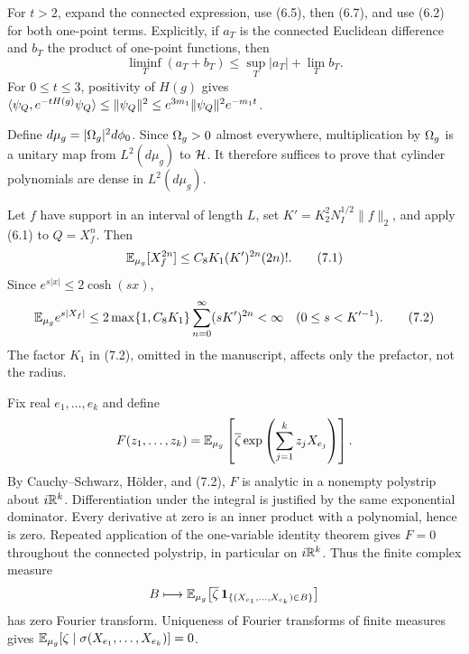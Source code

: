 \documentclass[11pt,a4paper]{article}
\begin{document}
\Because For $t>2$, expand the connected expression, use (6.5), then (6.7),
and use (6.2) for both one-point terms.  Explicitly, if $a_T$ is the connected
Euclidean difference and $b_T$ the product of one-point functions, then
\[
 \liminf_T(a_T+b_T)\leq\sup_T|a_T|+\lim_Tb_T.
\]
For $0\leq t\leq3$, positivity of $H(g)$ gives
$\langle \psi_Q,e^{-tH(g)}\psi_Q\rangle\leq\|\psi_Q\|^2
\leq e^{3m_1}\|\psi_Q\|^2e^{-m_1t}$.

\QedStep


Define $d\mu_g=|\Omega_g|^2d\phi_0$.  Since $\Omega_g>0$ almost everywhere,
multiplication by $\Omega_g$ is a unitary map from $L^2(d\mu_g)$ to $\mathcal H$.
It therefore suffices to prove that cylinder polynomials are dense in $L^2(d\mu_g)$.


\Because Let $f$ have support in an interval of length $L$, set
$K'=K_2^2N_I^{1/2}\|f\|_2$, and apply (6.1) to $Q=X_f^n$.  Then
\[
 \mathbb E_{\mu_g}[X_f^{2n}]
 \leq C_8K_1(K')^{2n}(2n)!.                                      \tag{7.1}
\]
Since $e^{s|x|}\leq2\cosh(sx)$,
\[
 \mathbb E_{\mu_g}e^{s|X_f|}
 \leq2\max\{1,C_8K_1\}\sum_{n=0}^\infty(sK')^{2n}<\infty
 \quad(0\leq s<K'^{-1}).                                         \tag{7.2}
\]
The factor $K_1$ in (7.2), omitted in the manuscript, affects only the prefactor,
not the radius.


\Because Fix real $e_1,\dots,e_k$ and define
\[
 F(z_1,\dots,z_k)=
 \mathbb E_{\mu_g}\left[\overline\zeta\exp\left(\sum_{j=1}^kz_jX_{e_j}\right)\right].
\]
By Cauchy--Schwarz, H\"older, and (7.2), $F$ is analytic in a nonempty
polystrip about $i\mathbb R^k$.  Differentiation under the integral is justified by the
same exponential dominator.  Every derivative at zero is an inner product with a
polynomial, hence is zero.  Repeated application of the one-variable identity theorem
gives $F=0$ throughout the connected polystrip, in particular on $i\mathbb R^k$.
Thus the finite complex measure
\[
 B\longmapsto\mathbb E_{\mu_g}\big[\overline\zeta\,
 \mathbf1_{\{(X_{e_1},\ldots,X_{e_k})\in B\}}\big]
\]
has zero Fourier transform.  Uniqueness of Fourier transforms of finite measures gives
$\mathbb E_{\mu_g}[\zeta\mid\sigma(X_{e_1},\dots,X_{e_k})]=0$.
\end{document}
